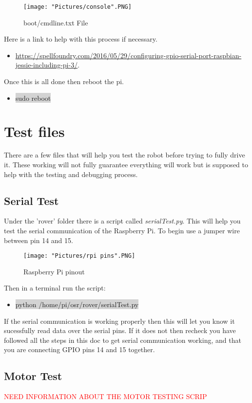 \documentclass[12pt]{article}
\begin{document}
\begin{figure}[H]
 	\centering
	\texttt{[image: "Pictures/console".PNG]}
 	\caption{boot/cmdline.txt File}
	\label{console}
\end{figure}

\noindent Here is a link to help with this process if necessary.
\begin{itemize}
	\item \href{https://spellfoundry.com/2016/05/29/configuring-gpio-serial-port-raspbian-jessie-including-pi-3/}{https://spellfoundry.com/2016/05/29/configuring-gpio-serial-port-raspbian-jessie-including-pi-3/}. 
\end{itemize}
\noindent Once this is all done then reboot the pi.
\begin{itemize}
	\item[] \colorbox{lightgray}{sudo reboot}
\end{itemize}


\section{Test files}
There are a few files that will help you test the robot before trying to fully drive it. These working will not fully guarantee everything will work but is supposed to help with the testing and debugging process.

\subsection{Serial Test}

Under the 'rover' folder there is a script called \textit{serialTest.py}. This will help you test the serial communication of the Raspberry Pi. To begin use a jumper wire between pin 14 and 15. 

\begin{figure}[H]
 	\centering
	\texttt{[image: "Pictures/rpi pins".PNG]}
 	\caption{Raspberry Pi pinout}
	\label{rpi pin}
\end{figure}


Then in a terminal run the script:
\begin{itemize}
	\item[] \colorbox{lightgray}{python /home/pi/osr/rover/serialTest.py}
\end{itemize}

If the serial communication is working properly then this will let you know it sucessfully read data over the serial pins. If it does not then recheck you have followed all the steps in this doc to get serial communication working, and that you are connecting GPIO pins 14 and 15 together. 

\subsection{Motor Test}

\textcolor{red}{NEED INFORMATION ABOUT THE MOTOR TESTING SCRIP}
\end{document}
